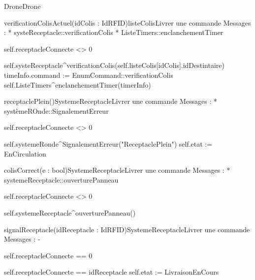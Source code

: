 \begin{OM}{Drone}{Drone}

\begin{OMOperation}{verificationColisActuel(idColis : IdRFID)}{listeColis}{Livrer une commande}
Messages :
* systeReceptacle::{verificationColis}
* ListeTimers::{enclanchementTimer}
\begin{OMPre}
self.receptacleConnecte <> 0
\end{OMPre}
\begin{OMPost}
        self.systeReceptacle^verificationColis(self.listeColis[idColis].idDestintaire)
        timeInfo.command := EnumCommand::verificationColis
        self.ListeTimers^enclanchementTimer(timerInfo)
    \end{OMPost}
\end{OMOperation}

\begin{OMOperation}{receptaclePlein()}{SystemeReceptacle}{Livrer une commande}
Messages :
* systèmeROnde::{SignalementErreur}
\begin{OMPre}
self.receptacleConnecte <> 0
\end{OMPre}
\begin{OMPost}
        self.systemeRonde^SignalementErreur("ReceptaclePlein")
self.etat := EnCirculation
\end{OMPost}
\end{OMOperation}

\begin{OMOperation}{colisCorrect(e : bool)}{SystemeReceptacle}{Livrer une commande}
Messages :
* systemeReceptacle::{ouverturePanneau}
\begin{OMPre}
self.receptacleConnecte <> 0
\end{OMPre}
\begin{OMPost}
        self.systemeReceptacle^ouverturePanneau()
    \end{OMPost}
\end{OMOperation}

\begin{OMOperation}{signalReceptacle(idReceptacle : IdRFID)}{SystemeReceptacle}{Livrer une commande}
Messages : -
\begin{OMPre}
self.receptacleConnecte == 0
\end{OMPre}
\begin{OMPost}
        self.receptacleConnecte == idReceptacle
        self.etat := LivraisonEnCours
    \end{OMPost}
\end{OMOperation}


\end{OM}
